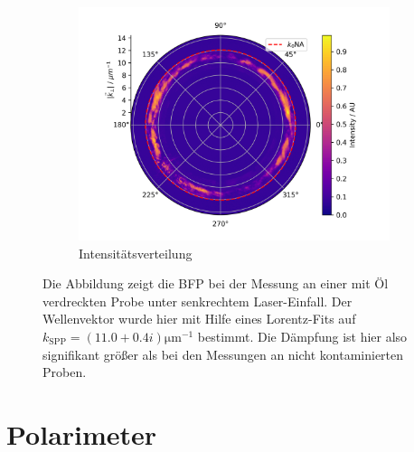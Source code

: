 \documentclass[titlepage]{article}
\begin{document}
\begin{figure}
		\begin{subfigure}[b]{0.7\textwidth}
		\centering
		\includegraphics[width=\textwidth]{figures/dirt_polar.png}
		\caption{Intensitätsverteilung}
		\label{fig:dirt_polar}
		\end{subfigure}
		\caption{Die Abbildung zeigt die BFP bei der Messung an einer mit Öl verdreckten Probe unter senkrechtem Laser-Einfall. Der Wellenvektor wurde hier mit Hilfe eines Lorentz-Fits auf $k_\mathrm{SPP} = (11.0 + 0.4i)\mathrm{\mu m}^{-1}$ bestimmt. Die Dämpfung ist hier also signifikant größer als bei den Messungen an nicht kontaminierten Proben.}			
	\end{figure}
		
	\section{Polarimeter}
	\newpage
\end{document}
